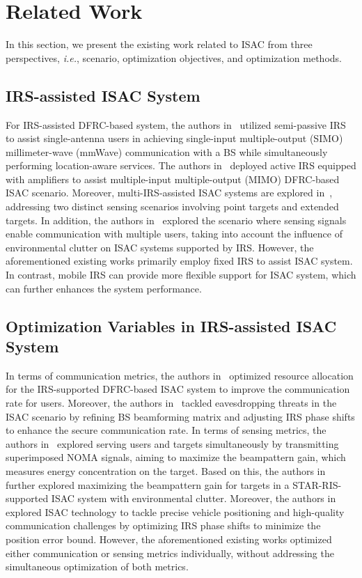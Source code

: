 \section{Related Work}
\label{sec: Related Work}

\par In this section, we present the existing work related to ISAC from three perspectives, \textit{i.e.}, scenario, optimization objectives, and optimization methods.

\subsection{IRS-assisted ISAC System}
\par For IRS-assisted DFRC-based system, the authors in~\cite{Hu2023} utilized semi-passive IRS to assist single-antenna users in achieving single-input multiple-output (SIMO) millimeter-wave (mmWave) communication with a BS while simultaneously performing location-aware services. The authors in~\cite{Li2023} deployed active IRS equipped with amplifiers to assist multiple-input multiple-output (MIMO) DFRC-based ISAC scenario. Moreover, multi-IRS-assisted ISAC systems are explored in~\cite{Fang2024}, addressing two distinct sensing scenarios involving point targets and extended targets. In addition, the authors in~\cite{Liao2023} explored the scenario where sensing signals enable communication with multiple users, taking into account the influence of environmental clutter on ISAC systems supported by IRS. However, the aforementioned existing works primarily employ fixed IRS to assist ISAC system. In contrast, mobile IRS can provide more flexible support for ISAC system, which can further enhances the system performance.

\subsection{Optimization Variables in IRS-assisted ISAC System}
\par In terms of communication metrics, the authors in~\cite{Wang2023,Xu2024} optimized resource allocation for the IRS-supported DFRC-based ISAC system to improve the communication rate for users. Moreover, the authors in~\cite{Li2024,Jiang2024} tackled eavesdropping threats in the ISAC scenario by refining BS beamforming matrix and adjusting IRS phase shifts to enhance the secure communication rate. In terms of sensing metrics, the authors in~\cite{Zuo2023} explored serving users and targets simultaneously by transmitting superimposed NOMA signals, aiming to maximize the beampattern gain, which measures energy concentration on the target. Based on this, the authors in~\cite{Zhang2025} further explored maximizing the beampattern gain for targets in a STAR-RIS-supported ISAC system with environmental clutter. Moreover, the authors in~\cite{Long2024} explored ISAC technology to tackle precise vehicle positioning and high-quality communication challenges by optimizing IRS phase shifts to minimize the position error bound. However, the aforementioned existing works optimized either communication or sensing metrics individually, without addressing the simultaneous optimization of both metrics.

